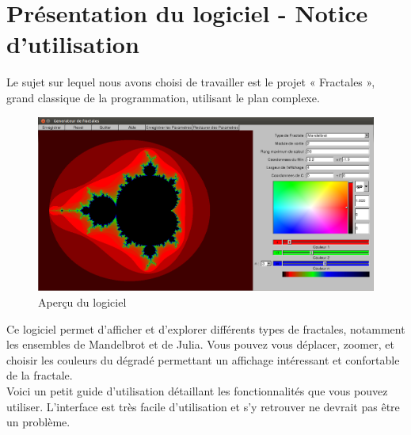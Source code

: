 \documentclass[a4paper,11pt]{article} \usepackage[T1]{fontenc} \usepackage[utf8]{inputenc} \usepackage[francais]{babel}
\begin{document}
\tableofcontents          %
\vspace{3cm}

\section{Présentation du logiciel - Notice d'utilisation}
Le sujet  sur lequel nous avons choisi de travailler est le projet « Fractales », grand classique de la programmation, utilisant le plan complexe.
\begin{figure}[H] \begin{center} \includegraphics[width=\textwidth]{Images/InterfaceTotale.png}
    \caption{Aperçu du logiciel}
\end{center} \end{figure}

Ce logiciel permet d'afficher et d'explorer différents types de fractales, notamment les ensembles de Mandelbrot et de Julia. Vous pouvez vous déplacer, zoomer, et choisir les couleurs du dégradé permettant un affichage intéressant et confortable de la fractale.\\

Voici un petit guide d'utilisation détaillant les fonctionnalités que vous pouvez utiliser. L'interface est très facile d'utilisation et s'y retrouver ne devrait pas être un problème.\\
\end{document}
